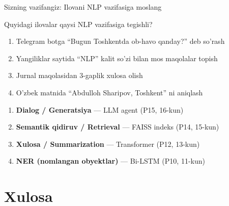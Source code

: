 \documentclass[aspectratio=169,11pt]{beamer}
\begin{document}
\begin{frame}{Sizning vazifangiz: Ilovani NLP vazifasiga moslang}
  \begin{tcolorbox}[warnbox,title=Savol --- 2 daqiqa]
    \small
    Quyidagi ilovalar qaysi NLP vazifasiga tegishli?
    \begin{enumerate}\setlength\itemsep{3pt}
      \item Telegram botga ``Bugun Toshkentda ob-havo qanday?'' deb so'rash
      \item Yangiliklar saytida ``NLP'' kalit so'zi bilan mos maqolalar topish
      \item Jurnal maqolasidan 3-gaplik xulosa olish
      \item O'zbek matnida ``Abdulloh Sharipov, Toshkent'' ni aniqlash
    \end{enumerate}
  \end{tcolorbox}
  \pause
  \begin{tcolorbox}[okbox,title=Javob]
    \footnotesize
    \begin{enumerate}\setlength\itemsep{2pt}
      \item \textbf{Dialog / Generatsiya} --- LLM agent (P15, 16-kun)
      \item \textbf{Semantik qidiruv / Retrieval} --- FAISS indeks (P14, 15-kun)
      \item \textbf{Xulosa / Summarization} --- Transformer (P12, 13-kun)
      \item \textbf{NER (nomlangan obyektlar)} --- Bi-LSTM (P10, 11-kun)
    \end{enumerate}
  \end{tcolorbox}
\end{frame}

\section[Xulosa]{Xulosa}
\end{document}
